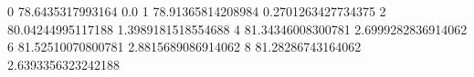 0 78.6435317993164 0.0
1 78.91365814208984 0.2701263427734375
2 80.04244995117188 1.3989181518554688
4 81.34346008300781 2.6999282836914062
6 81.52510070800781 2.8815689086914062
8 81.28286743164062 2.6393356323242188
